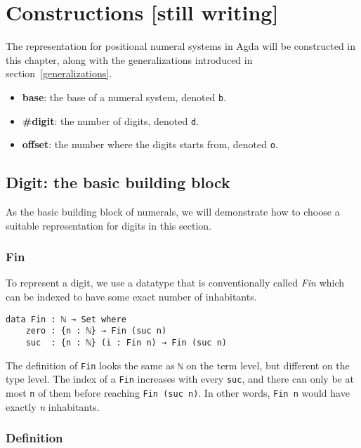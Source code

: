 \documentclass[../thesis.tex]{subfiles}
\begin{document}
\chapter{Constructions [still writing]}

The representation for positional numeral systems in Agda will be constructed in this
chapter, along with the generalizations introduced in section~\ref{generalizations}.

\begin{itemize}
    \item \textbf{base}: the base of a numeral system, denoted {\lstinline|b|}.
    \item \textbf{\#digit}: the number of digits, denoted {\lstinline|d|}.
    \item \textbf{offset}: the number where the digits starts from, denoted {\lstinline|o|}.
\end{itemize}

\section{Digit: the basic building block}\label{digit}

As the basic building block of numerals, we will demonstrate how to choose a
suitable representation for digits in this section.

\subsection{Fin}

To represent a digit, we use a datatype that is conventionally called \textit{Fin}
which can be indexed to have some exact number of inhabitants.

\begin{lstlisting}
data Fin : ℕ → Set where
    zero : {n : ℕ} → Fin (suc n)
    suc  : {n : ℕ} (i : Fin n) → Fin (suc n)
\end{lstlisting}

The definition of {\lstinline|Fin|} looks the same as {\lstinline|ℕ|} on the term
level, but different on the type level. The index of a {\lstinline|Fin|} increases
with every {\lstinline|suc|}, and there can only be at most {\lstinline|n|} of
them before reaching {\lstinline|Fin (suc n)|}. In other words, {\lstinline|Fin n|}
would have exactly \textit{n} inhabitants.

\subsection{Definition}
\end{document}

